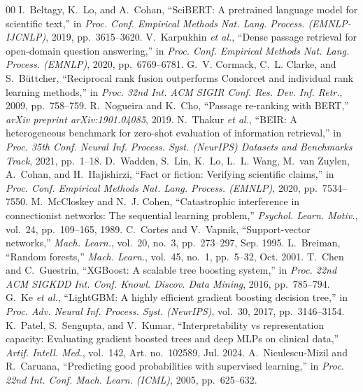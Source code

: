 \documentclass[journal]{IEEEtran}
\begin{document}
\begin{thebibliography}{00}
 I.~Beltagy, K.~Lo, and A.~Cohan, ``SciBERT: A pretrained language model for scientific text,'' in \textit{Proc. Conf. Empirical Methods Nat. Lang. Process. (EMNLP-IJCNLP)}, 2019, pp.~3615--3620.
 V.~Karpukhin \textit{et al.}, ``Dense passage retrieval for open-domain question answering,'' in \textit{Proc. Conf. Empirical Methods Nat. Lang. Process. (EMNLP)}, 2020, pp.~6769--6781.
 G.~V. Cormack, C.~L. Clarke, and S.~Büttcher, ``Reciprocal rank fusion outperforms Condorcet and individual rank learning methods,'' in \textit{Proc. 32nd Int. ACM SIGIR Conf. Res. Dev. Inf. Retr.}, 2009, pp.~758--759.
 R.~Nogueira and K.~Cho, ``Passage re-ranking with BERT,'' \textit{arXiv preprint arXiv:1901.04085}, 2019.
 N.~Thakur \textit{et al.}, ``BEIR: A heterogeneous benchmark for zero-shot evaluation of information retrieval,'' in \textit{Proc. 35th Conf. Neural Inf. Process. Syst. (NeurIPS) Datasets and Benchmarks Track}, 2021, pp.~1--18.
 D.~Wadden, S.~Lin, K.~Lo, L.~L. Wang, M.~van Zuylen, A.~Cohan, and H.~Hajishirzi, ``Fact or fiction: Verifying scientific claims,'' in \textit{Proc. Conf. Empirical Methods Nat. Lang. Process. (EMNLP)}, 2020, pp.~7534--7550.
 M.~McCloskey and N.~J. Cohen, ``Catastrophic interference in connectionist networks: The sequential learning problem,'' \textit{Psychol. Learn. Motiv.}, vol.~24, pp.~109--165, 1989.
 C.~Cortes and V.~Vapnik, ``Support-vector networks,'' \textit{Mach. Learn.}, vol.~20, no.~3, pp.~273--297, Sep. 1995.
 L.~Breiman, ``Random forests,'' \textit{Mach. Learn.}, vol.~45, no.~1, pp.~5--32, Oct. 2001.
 T.~Chen and C.~Guestrin, ``XGBoost: A scalable tree boosting system,'' in \textit{Proc. 22nd ACM SIGKDD Int. Conf. Knowl. Discov. Data Mining}, 2016, pp.~785--794.
 G.~Ke \textit{et al.}, ``LightGBM: A highly efficient gradient boosting decision tree,'' in \textit{Proc. Adv. Neural Inf. Process. Syst. (NeurIPS)}, vol.~30, 2017, pp.~3146--3154.
 K.~Patel, S.~Sengupta, and V.~Kumar, ``Interpretability vs representation capacity: Evaluating gradient boosted trees and deep MLPs on clinical data,'' \textit{Artif. Intell. Med.}, vol.~142, Art. no.~102589, Jul. 2024.
 A.~Niculescu-Mizil and R.~Caruana, ``Predicting good probabilities with supervised learning,'' in \textit{Proc. 22nd Int. Conf. Mach. Learn. (ICML)}, 2005, pp.~625--632.

\end{thebibliography}
\end{document}
